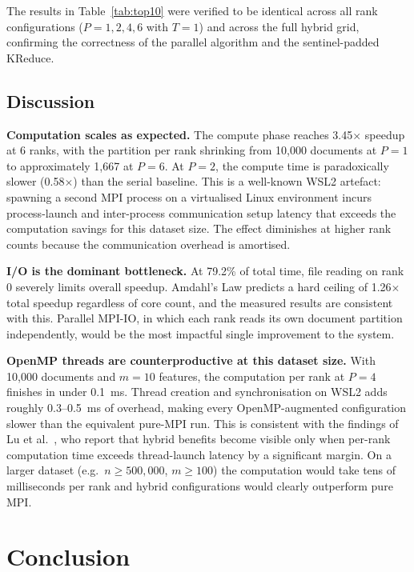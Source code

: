 \documentclass[12pt,a4paper]{article}
\begin{document}
The results in Table~\ref{tab:top10} were verified to be identical
across all rank configurations ($P = 1, 2, 4, 6$ with $T = 1$) and
across the full hybrid grid, confirming the correctness of the parallel
algorithm and the sentinel-padded KReduce.

\subsection{Discussion}
\label{sec:disc}

\textbf{Computation scales as expected.} The compute phase reaches
3.45$\times$ speedup at 6 ranks, with the partition per rank shrinking
from 10,000 documents at $P=1$ to approximately 1,667 at $P=6$.
At $P=2$, the compute time is paradoxically slower (0.58$\times$)
than the serial baseline. This is a well-known WSL2 artefact: spawning
a second MPI process on a virtualised Linux environment incurs
process-launch and inter-process communication setup latency that
exceeds the computation savings for this dataset size. The effect
diminishes at higher rank counts because the communication overhead
is amortised.

\textbf{I/O is the dominant bottleneck.} At 79.2\% of total time,
file reading on rank 0 severely limits overall speedup. Amdahl's Law
predicts a hard ceiling of 1.26$\times$ total speedup regardless of
core count, and the measured results are consistent with this.
Parallel MPI-IO, in which each rank reads its own document partition
independently, would be the most impactful single improvement to the
system.

\textbf{OpenMP threads are counterproductive at this dataset size.}
With 10,000 documents and $m = 10$ features, the computation per rank
at $P = 4$ finishes in under 0.1~ms. Thread creation and synchronisation
on WSL2 adds roughly 0.3--0.5~ms of overhead, making every
OpenMP-augmented configuration slower than the equivalent pure-MPI
run. This is consistent with the findings of Lu et al.\ \cite{lu2023hybrid},
who report that hybrid benefits become visible only when per-rank
computation time exceeds thread-launch latency by a significant margin.
On a larger dataset (e.g.\ $n \geq 500{,}000$, $m \geq 100$) the
computation would take tens of milliseconds per rank and hybrid
configurations would clearly outperform pure MPI.

\clearpage
\section{Conclusion}
\end{document}
